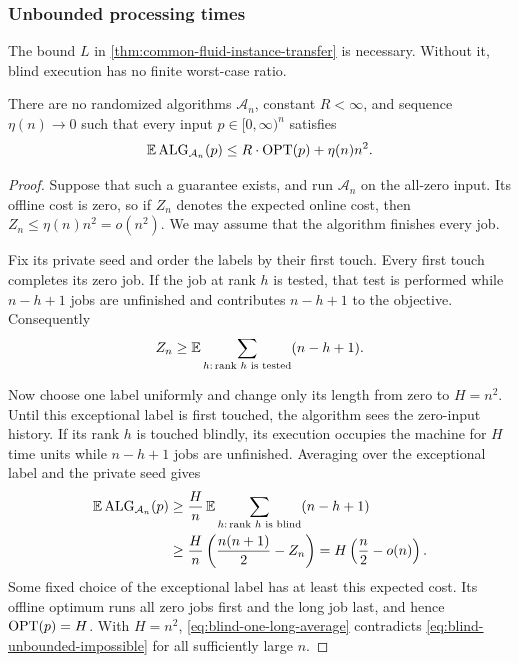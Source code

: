 \subsubsection{Unbounded processing times}

The bound $L$ in \cref{thm:common-fluid-instance-transfer} is necessary.
Without it, blind execution has no finite worst-case ratio.

\begin{theorem}
\label{thm:blind-unbounded-impossible}
There are no randomized algorithms $\mathcal A_n$, constant $R<\infty$, and
sequence $\eta(n)\to0$ such that every input
$p\in[0,\infty)^n$ satisfies
\begin{equation}
 \mathbb{E}\operatorname{ALG}_{\mathcal A_n}(p)
 \le R\cdot\operatorname{OPT}(p)+\eta(n)n^2.
 \label{eq:blind-unbounded-impossible}
\end{equation}
\end{theorem}

\begin{proof}
Suppose that such a guarantee exists, and run $\mathcal A_n$ on the all-zero
input.  Its offline cost is zero, so if $Z_n$ denotes the expected online
cost, then $Z_n\le\eta(n)n^2=o(n^2)$.  We may assume that the algorithm
finishes every job.

Fix its private seed and order the labels by their first touch.  Every first
touch completes its zero job.  If the job at rank $h$ is tested, that test is
performed while $n-h+1$ jobs are unfinished and contributes $n-h+1$ to the
objective.  Consequently
\begin{equation}
 Z_n\ge\mathbb{E}\sum_{h:\,\text{rank }h\text{ is tested}}(n-h+1).
 \label{eq:blind-zero-test-area}
\end{equation}

Now choose one label uniformly and change only its length from zero to
$H=n^2$.  Until this exceptional label is first touched, the algorithm sees
the zero-input history.  If its rank $h$ is touched blindly, its execution
occupies the machine for $H$ time units while $n-h+1$ jobs are unfinished.
Averaging over the exceptional label and the private seed gives
\begin{align}
 \mathbb{E}\operatorname{ALG}_{\mathcal A_n}(p)
 &\ge \frac Hn\,\mathbb{E}
   \sum_{h:\,\text{rank }h\text{ is blind}}(n-h+1)\notag\\
 &\ge\frac Hn\left(\frac{n(n+1)}2-Z_n\right)
  =H\left(\frac n2-o(n)\right).
 \label{eq:blind-one-long-average}
\end{align}
Some fixed choice of the exceptional label has at least this expected cost.
Its offline optimum runs all zero jobs first and the long job last, and hence
$\operatorname{OPT}(p)=H$.  With $H=n^2$, \cref{eq:blind-one-long-average} contradicts
\cref{eq:blind-unbounded-impossible} for all sufficiently large $n$.
\end{proof}
